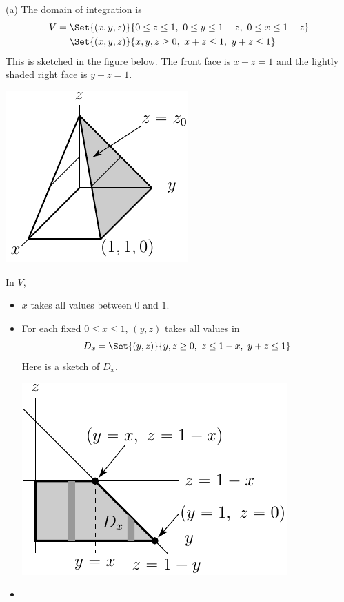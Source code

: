 \begin{solution}
(a)
 The domain of integration is 
\begin{align*}
V &= \Set{(x,y,z)}{0\le z\le 1,\ 0\le y\le 1-z,\ 0\le x\le 1-z} \\
  &= \Set{(x,y,z)}{ x,y,z\ge 0,\ x+z\le 1,\ y+z\le 1 }
\end{align*}
This is sketched in the figure below. The front face is $x+z=1$ and the 
lightly shaded right face is $y+z=1$.
\begin{center}
     \includegraphics{fig/domainFivehedron1.pdf}
\end{center}
In $V$, 
\begin{itemize}
\item
$x$ takes all values between $0$ and $1$. 
\item
For each fixed $0\le x\le 1$, $(y,z)$ takes all values in
\begin{equation*}
D_x=\Set{(y,z)}{y,z\ge 0,\ z\le 1-x,\ y+z\le 1}
\end{equation*}
Here is a sketch of $D_x$.
\begin{center}
     \includegraphics{fig/domainFivehedron2.pdf}
\end{center}
\item 

\end{itemize}
\end{solution}
